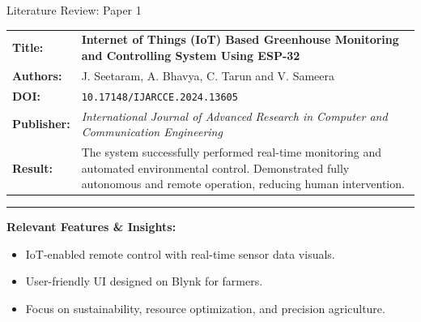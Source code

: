 \documentclass{beamer}
\begin{document}
\begin{frame} {Literature Review: Paper 1}

    \begin{tabularx} {\textwidth} {
            >{\bfseries}m{2.0cm}X
        }

        Title: & \textbf{Internet of Things (IoT) Based Greenhouse Monitoring and Controlling System Using ESP-32}
        \\

        Authors: & J. Seetaram, A. Bhavya, C. Tarun and V. Sameera
        \\

        DOI: & \texttt{10.17148/IJARCCE.2024.13605}

        \\

        Publisher: & \textit{International Journal of Advanced Research in Computer and Communication Engineering} \vfill
        \\

        Result: &
        The system successfully performed real-time monitoring and automated environmental control.
        Demonstrated fully autonomous and remote operation, reducing human intervention.

        \\

    \end{tabularx}

    {\color{leafColorSecondary} \rule{\textwidth}{0.75pt}}

    \textbf{Relevant Features \& Insights:}

    \begin{itemize}
        \item IoT-enabled remote control with real-time sensor data visuals.

        \item User-friendly UI designed on Blynk for farmers.

        \item Focus on sustainability, resource optimization, and precision agriculture.
    \end{itemize}

\end{frame}
\end{document}
